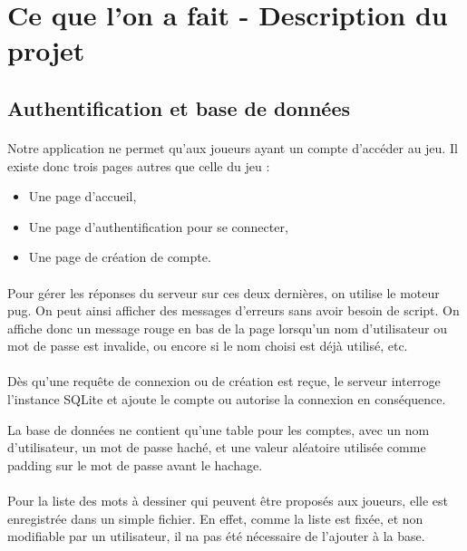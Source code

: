 \documentclass[11pt,a4paper]{article}
\begin{document}
    \section{Ce que l'on a fait - Description du projet}
        \subsection{Authentification et base de données}
            \paragraph{}
            Notre application ne permet qu'aux joueurs ayant un compte d'accéder au jeu.
            Il existe donc trois pages autres que celle du jeu :
            \begin{itemize}
                \item Une page d'accueil,
                \item Une page d'authentification pour se connecter,
                \item Une page de création de compte.
            \end{itemize}
            \paragraph{}
            Pour gérer les réponses du serveur sur ces deux dernières,
            on utilise le moteur pug.
            On peut ainsi afficher des messages d'erreurs sans avoir besoin de script.
            On affiche donc un message rouge en bas de la page lorsqu'un nom d'utilisateur ou mot de passe est invalide,
            ou encore si le nom choisi est déjà utilisé, etc.
            \paragraph{}
            Dès qu'une requête de connexion ou de création est reçue,
            le serveur interroge l'instance SQLite et ajoute le compte ou autorise la connexion en conséquence.

            La base de données ne contient qu'une table pour les comptes, avec un nom d'utilisateur, un mot de passe haché,
            et une valeur aléatoire utilisée comme padding sur le mot de passe avant le hachage.
            \paragraph{}
            Pour la liste des mots à dessiner qui peuvent être proposés aux joueurs,
            elle est enregistrée dans un simple fichier.
            En effet, comme la liste est fixée, et non modifiable par un utilisateur,
            il na pas été nécessaire de l'ajouter à la base.
\end{document}
